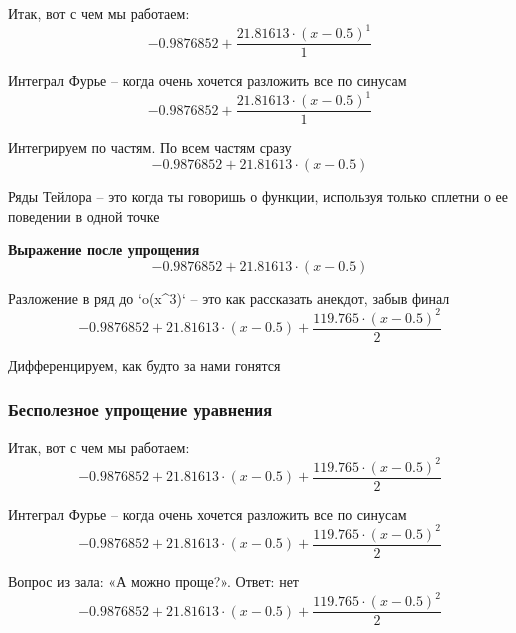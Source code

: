 \documentclass{article}
\begin{document}
Итак, вот с чем мы работаем:\\
\begin{dmath*}
-0.9876852 + \frac{21.81613 \cdot (x - 0.5)^{1}}{1}
\end{dmath*}


Интеграл Фурье – когда очень хочется разложить все по синусам 
\begin{dmath*}
-0.9876852 + \frac{21.81613 \cdot (x - 0.5)^{1}}{1}
\end{dmath*}


Интегрируем по частям. По всем частям сразу 
\begin{dmath*}
-0.9876852 + 21.81613 \cdot (x - 0.5)
\end{dmath*}


Ряды Тейлора – это когда ты говоришь о функции, используя только сплетни о ее поведении в одной точке 

\noindent\textbf{Выражение после упрощения}\\[4pt]
\begin{dmath*}
-0.9876852 + 21.81613 \cdot (x - 0.5)
\end{dmath*}


Разложение в ряд до `o(x^3)` – это как рассказать анекдот, забыв финал 
\begin{dmath*}
-0.9876852 + 21.81613 \cdot (x - 0.5) + \frac{119.765 \cdot (x - 0.5)^{2}}{2}
\end{dmath*}


Дифференцируем, как будто за нами гонятся 
\subsubsection*{Бесполезное упрощение уравнения}

Итак, вот с чем мы работаем:\\
\begin{dmath*}
-0.9876852 + 21.81613 \cdot (x - 0.5) + \frac{119.765 \cdot (x - 0.5)^{2}}{2}
\end{dmath*}


Интеграл Фурье – когда очень хочется разложить все по синусам 
\begin{dmath*}
-0.9876852 + 21.81613 \cdot (x - 0.5) + \frac{119.765 \cdot (x - 0.5)^{2}}{2}
\end{dmath*}


Вопрос из зала: «А можно проще?». Ответ: нет 
\begin{dmath*}
-0.9876852 + 21.81613 \cdot (x - 0.5) + \frac{119.765 \cdot (x - 0.5)^{2}}{2}
\end{dmath*}
\end{document}

